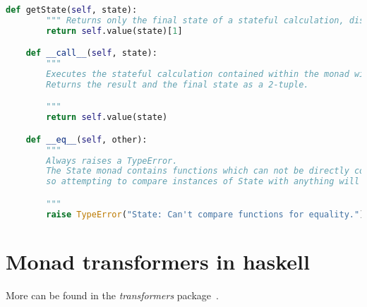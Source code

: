 \begin{lstlisting}[language=Python]
	def getState(self, state):
		""" Returns only the final state of a stateful calculation, discarding the result.  """
		return self.value(state)[1]

	def __call__(self, state):
		"""
		Executes the stateful calculation contained within the monad with an initial 'state'.
		Returns the result and the final state as a 2-tuple.

		"""
		return self.value(state)

	def __eq__(self, other):
		"""
		Always raises a TypeError.
		The State monad contains functions which can not be directly compared for equality,
		so attempting to compare instances of State with anything will always fail.

		"""
		raise TypeError("State: Can't compare functions for equality.")
\end{lstlisting}


\chapter{Monad transformers in haskell}\label{app:monadshaskell}
More can be found in the \emph{transformers} package~\cite{haskelllibrary}.

